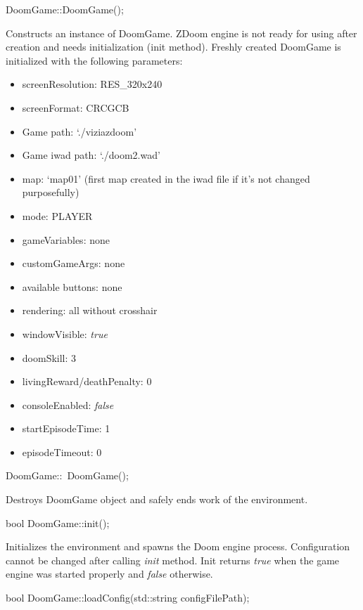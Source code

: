 \documentclass[english,bachelor,a4paper,twoside]{ppfcmthesis}
\begin{document}
\begin{clinee}
DoomGame::DoomGame();
\end{clinee}

	Constructs an instance of DoomGame. ZDoom engine is not ready for using after creation and needs initialization (init method). Freshly created DoomGame is initialized with the following parameters:
	\begin{itemize}
		\item screenResolution: RES\_320x240
		\item screenFormat: CRCGCB
		\item Game path: `./viziazdoom'
		\item Game iwad path: `./doom2.wad'
		\item map: `map01' (first map created in the iwad file if it's not changed purposefully)
		\item mode: PLAYER
		\item gameVariables: none
		\item customGameArgs: none
		\item available buttons: none
		\item rendering: all without crosshair
		\item windowVisible: \emph{true} 
		\item doomSkill: 3
		\item livingReward/deathPenalty: 0
		\item consoleEnabled: \emph{false}
		\item startEpisodeTime: 1
		\item episodeTimeout: 0
	\end{itemize}

\vspace{20pt}
\begin{clinee}
DoomGame::~DoomGame();
\end{clinee}
	Destroys DoomGame object and safely ends work of the environment.


\vspace{20pt}
\begin{clinee}
bool DoomGame::init();
\end{clinee}

	Initializes the environment and spawns the Doom engine process. Configuration cannot be changed after calling \emph{init} method. Init returns \emph{true} when the game engine was started properly and \emph{false} otherwise. 


\vspace{20pt}
\begin{clinee}
bool DoomGame::loadConfig(std::string configFilePath);
\end{clinee}
\end{document}
